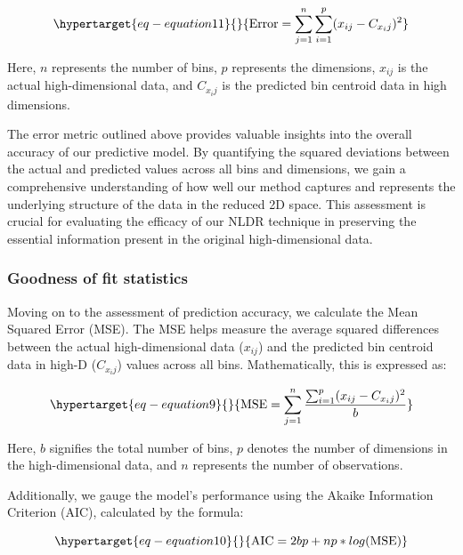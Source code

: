 \documentclass[
  12pt]{article}
\begin{document}
\begin{equation}\protect\hypertarget{eq-equation11}{}{
\text{Error} = \sum_{j = 1}^{n}\sum_{i = 1}^{p} (x_{ij} - C_{x_ij})^2
}\label{eq-equation11}\end{equation}

Here, \(n\) represents the number of bins, \(p\) represents the
dimensions, \(x_{ij}\) is the actual high-dimensional data, and
\(C_{x_ij}\) is the predicted bin centroid data in high dimensions.

The error metric outlined above provides valuable insights into the
overall accuracy of our predictive model. By quantifying the squared
deviations between the actual and predicted values across all bins and
dimensions, we gain a comprehensive understanding of how well our method
captures and represents the underlying structure of the data in the
reduced 2D space. This assessment is crucial for evaluating the efficacy
of our NLDR technique in preserving the essential information present in
the original high-dimensional data.

\hypertarget{sec-goodfit}{%
\subsubsection{Goodness of fit statistics}\label{sec-goodfit}}

Moving on to the assessment of prediction accuracy, we calculate the
Mean Squared Error (MSE). The MSE helps measure the average squared
differences between the actual high-dimensional data (\(x_{ij}\)) and
the predicted bin centroid data in high-D (\(C_{x_ij}\)) values across
all bins. Mathematically, this is expressed as:

\begin{equation}\protect\hypertarget{eq-equation9}{}{
\text{MSE} = \sum_{j = 1}^{n} \frac{\sum_{i = 1}^{p} (x_{ij} - C_{x_ij})^2}{b}
}\label{eq-equation9}\end{equation}

Here, \(b\) signifies the total number of bins, \(p\) denotes the number
of dimensions in the high-dimensional data, and \(n\) represents the
number of observations.

Additionally, we gauge the model's performance using the Akaike
Information Criterion (AIC), calculated by the formula:

\begin{equation}\protect\hypertarget{eq-equation10}{}{
\text{AIC} = 2bp + np * log(\text{MSE})
}\label{eq-equation10}\end{equation}
\end{document}
